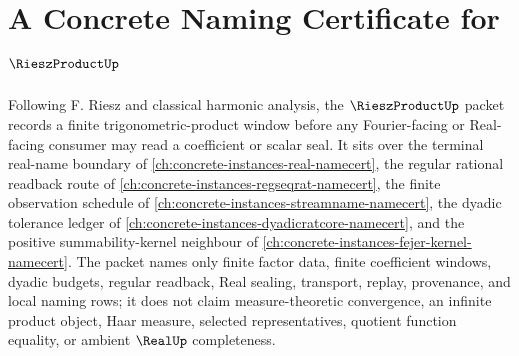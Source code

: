 \chapter{A Concrete Naming Certificate for $\RieszProductUp$}
\label{ch:concrete-instances-riesz-product-namecert}

Following F. Riesz and classical harmonic analysis, the $\RieszProductUp$ packet records a finite trigonometric-product window before any Fourier-facing or Real-facing consumer may read a coefficient or scalar seal. It sits over the terminal real-name boundary of \autoref{ch:concrete-instances-real-namecert}, the regular rational readback route of \autoref{ch:concrete-instances-regseqrat-namecert}, the finite observation schedule of \autoref{ch:concrete-instances-streamname-namecert}, the dyadic tolerance ledger of \autoref{ch:concrete-instances-dyadicratcore-namecert}, and the positive summability-kernel neighbour of \autoref{ch:concrete-instances-fejer-kernel-namecert}. The packet names only finite factor data, finite coefficient windows, dyadic budgets, regular readback, Real sealing, transport, replay, provenance, and local naming rows; it does not claim measure-theoretic convergence, an infinite product object, Haar measure, selected representatives, quotient function equality, or ambient $\RealUp$ completeness.

